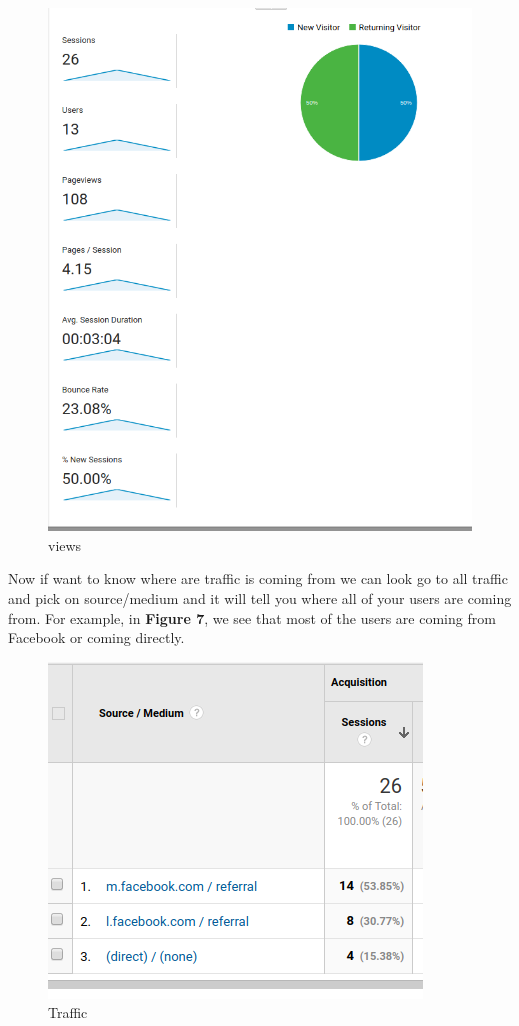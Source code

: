 \documentclass{article}
\begin{document}
\begin{figure}[t]
\includegraphics[scale = .5]{newuser.png}
\centering
\caption{views}
\end{figure}

Now if want to know where are traffic is coming from we can look go to all traffic and pick on source/medium and it will tell you where all of your users are coming from. For example, in \textbf{Figure 7}, we see that most of the users are coming from Facebook or coming directly.

\begin{figure}[t]
\includegraphics[scale = .5]{traffic.png}
\centering
\caption{Traffic}
\end{figure}
\end{document}
